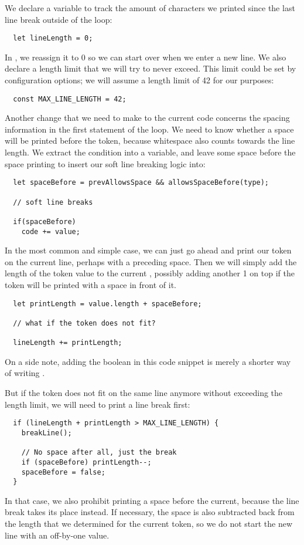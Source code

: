 We declare a variable to track the amount of characters
we printed since the last line break outside of the loop:
\begin{verbatim}
  let lineLength = 0;
\end{verbatim}
In , we reassign it to 0
so we can start over when we enter a new line.
We also declare a length limit that we will try to never exceed.
This limit could be set by configuration options;
we will assume a length limit of 42 for our purposes:
\begin{verbatim}
  const MAX_LINE_LENGTH = 42;
\end{verbatim}

Another change that we need to make to the current code
concerns the spacing information in the first statement of the loop.
We need to know whether a space will be printed before the token,
because whitespace also counts towards the line length.
We extract the condition into a variable,
and leave some space before the space printing
to insert our soft line breaking logic into:
\begin{verbatim}
  let spaceBefore = prevAllowsSpace && allowsSpaceBefore(type);

  // soft line breaks

  if(spaceBefore)
    code += value;
\end{verbatim}

In the most common and simple case,
we can just go ahead and print our token
on the current line,
perhaps with a preceding space.
Then we will simply add the length of the token value
to the current ,
possibly adding another 1 on top if
the token will be printed with a space in front of it.
\begin{verbatim}
  let printLength = value.length + spaceBefore;

  // what if the token does not fit?

  lineLength += printLength;
\end{verbatim}
On a side note, adding the boolean 
in this code snippet is merely a shorter way of
writing .

But if the token does not fit on the same line anymore
without exceeding the length limit,
we will need to print a line break first:
\begin{verbatim}
  if (lineLength + printLength > MAX_LINE_LENGTH) {
    breakLine();

    // No space after all, just the break
    if (spaceBefore) printLength--;
    spaceBefore = false;
  }
\end{verbatim}
In that case, we also prohibit printing a space before the current,
because the line break takes its place instead.
If necessary, the space is also subtracted back from the length
that we determined for the current token,
so we do not start the new line with an off-by-one  value.

